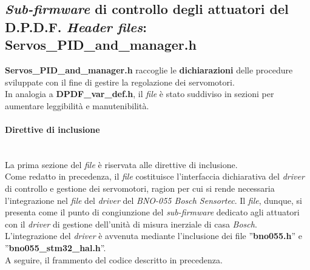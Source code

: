 
\subsection{\textit{Sub-firmware} di controllo degli attuatori del D.P.D.F. \textit{Header files}: Servos\_PID\_and\_manager.h}
\label{ServosPIDandManager}
\textbf{Servos\_PID\_and\_manager.h} raccoglie le \textbf{dichiarazioni} delle procedure sviluppate con il fine di gestire la regolazione dei servomotori.\\
In analogia a \textbf{DPDF\_var\_def.h}, il \textit{file} è stato suddiviso in sezioni per aumentare leggibilità e manutenibilità.

\paragraph{Direttive di inclusione}\mbox{}\\
La prima sezione del \textit{file} è riservata alle direttive di inclusione.\\
Come redatto in precedenza, il \textit{file} costituisce l'interfaccia dichiarativa del \textit{driver} di controllo e gestione dei servomotori, ragion per cui si rende necessaria l'integrazione nel \textit{file} del \textit{driver} del \textit{BNO-055 Bosch Sensortec}.
Il \textit{file}, dunque, si presenta come il punto di congiunzione del \textit{sub-firmware} dedicato agli attuatori con il \textit{driver} di gestione dell'unità di misura inerziale di casa \textit{Bosch}.\\
L'integrazione del \textit{driver} è avvenuta mediante l'inclusione dei file ''\textbf{bno055.h}'' e ''\textbf{bno055\_stm32\_hal.h}''.\\
A seguire, il frammento del codice descritto in precedenza.\\



